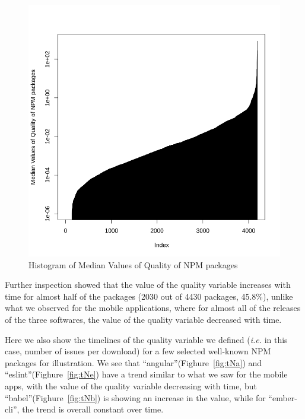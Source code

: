 \documentclass[smallextended]{svjour3}       %
\begin{document}
\begin{figure}[!t]
\centering
\includegraphics[width=0.75\linewidth]{qNPM}
\vspace{-10pt}
\caption{Histogram of Median Values of Quality of NPM packages}
\label{fig:qNPM}
\vspace{-10pt}
\end{figure}

Further inspection showed that the value of the quality variable increases with time for almost half of the packages (2030 out of 4430 packages, 45.8\%), unlike what we observed for the mobile applications, where for almost all of the releases of the three softwares, the value of the quality variable decreased with time.

Here we also show the timelines of the quality variable we defined (\emph{i.e.} in this case, number of issues per download) for a few selected well-known NPM packages for illustration. We see that ``angular''(Fighure~\ref{fig:tNa}) and ``eslint''(Fighure~\ref{fig:tNe}) have a trend similar to what we saw for the mobile apps, with the value of the quality variable decreasing with time, but ``babel''(Fighure~\ref{fig:tNb}) is showing an increase in the value, while for ``ember-cli'', the trend is overall constant over time.
\end{document}
